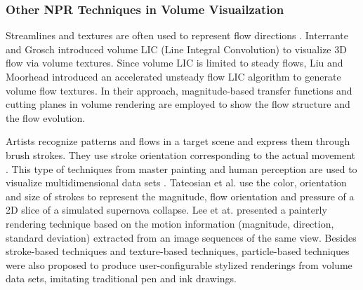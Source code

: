 \subsubsection{Other NPR Techniques in Volume Visuailzation \label{painterly_rendering}}
Streamlines and textures are often used to represent flow directions \cite{urnessy_techniques_2004}. Interrante and Grosch \cite{interrante_strategies_1997} introduced volume LIC (Line Integral Convolution) to visualize 3D flow via volume textures.
Since volume LIC is limited to steady flows, Liu and Moorhead \cite{liu_texture-based_2005} introduced an accelerated unsteady flow LIC algorithm to generate volume flow textures.
In their approach, magnitude-based transfer functions and cutting planes in volume rendering are employed to show the flow structure and the flow evolution.

Artists recognize patterns and flows in a target scene and express them through brush strokes. They use stroke orientation corresponding to the actual movement \cite{lee_motion_2009}. This type of techniques from master painting and human perception are used to visualize multidimensional data sets \cite{healey_perceptually_2004}. Tateosian et al. \cite{tateosian_engaging_2007} use the color, orientation and size of strokes to represent the magnitude, flow orientation and pressure of a 2D slice of a simulated supernova collapse.
Lee et at. \cite{lee_motion_2009} presented a painterly rendering technique based on the motion information (magnitude, direction, standard deviation) extracted from an image sequences of the same view.
Besides stroke-based techniques and texture-based techniques, particle-based techniques \cite{busking_particle-based_2007} \cite{van_pelt_illustrative_2010} were also proposed to produce user-configurable stylized renderings from volume data sets, imitating traditional pen and ink drawings.

